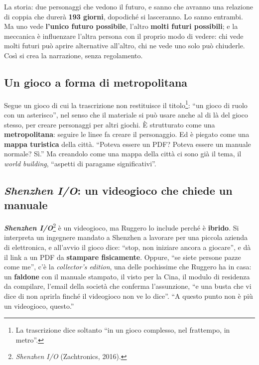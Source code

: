La storia: due personaggi che vedono il futuro, e sanno che avranno una relazione di
coppia che durerà \textbf{193 giorni}, dopodiché si lasceranno. Lo sanno entrambi. Ma uno
vede \textbf{l'unico futuro possibile}, l'altro \textbf{molti futuri possibili}; e la
meccanica è influenzare l'altra persona con il proprio modo di vedere: chi vede molti
futuri può aprire alternative all'altro, chi ne vede uno solo può chiuderle. Così si crea
la narrazione, senza regolamento.

\subsection{Un gioco a forma di metropolitana}



Segue un gioco di cui la trascrizione non restituisce il titolo\footnote{La
trascrizione dice soltanto ``in un gioco complesso, nel frattempo, in metro''.}: ``un
gioco di ruolo con un asterisco'', nel senso che il materiale si può usare anche al di là
del gioco stesso, per creare personaggi per altri giochi. È strutturato come una
\textbf{metropolitana}: seguire le linee fa creare il personaggio. Ed è piegato come una
\textbf{mappa turistica} della città. ``Poteva essere un PDF? Poteva essere un manuale
normale? Sì.'' Ma creandolo come una mappa della città ci sono già il tema, il
\emph{world building}, ``aspetti di paragame significativi''.

\subsection{\emph{Shenzhen I/O}: un videogioco che chiede un manuale}



\textbf{\emph{Shenzhen I/O}}\footnote{\emph{Shenzhen I/O} (Zachtronics, 2016).} è un
videogioco, ma Ruggero lo include perché è \textbf{ibrido}. Si interpreta un ingegnere
mandato a Shenzhen a lavorare per una piccola azienda di elettronica, e all'avvio il
gioco dice: ``stop, non iniziare ancora a giocare'', e dà il link a un PDF da
\textbf{stampare fisicamente}. Oppure, ``se siete persone pazze come me'', c'è la
\emph{collector's edition}, una delle pochissime che Ruggero ha in casa: un
\textbf{faldone} con il manuale stampato, il visto per la Cina, il modulo di residenza da
compilare, l'email della società che conferma l'assunzione, ``e una busta che vi dice
di non aprirla finché il videogioco non ve lo dice''. ``A questo punto non è più un
videogioco, questo.''

